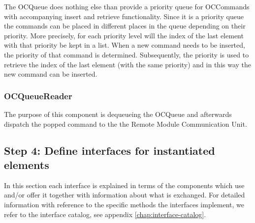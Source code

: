 \npar The OCQueue does nothing else than provide a priority queue for
OCCommands with accompanying insert and retrieve functionality. Since
it is a priority queue the commands can be placed in different places in the
queue depending on their priority. More precisely, for each priority level will
the index of the last element with that priority be kept in a list. When a new
command needs to be inserted, the priority of that command is determined.
Subsequently, the priority is used to retrieve the index of the last element
(with the same priority) and in this way the new command can be inserted.

\subsubsection{OCQueueReader}

\npar The purpose of this component is dequeueing the OCQueue and
afterwards dispatch the popped command to the the Remote Module Communication
Unit.

% 
% 
% 

\subsection{Step 4: Define interfaces for instantiated elements}
\label{add:it7/interfaces}

\npar In this section each interface is explained in terms of the components
which use and/or offer it together with information about what is exchanged. For
detailed information with reference to the specific methods the interfaces
implement, we refer to the interface catalog, see appendix
\ref{chap:interface-catalog}.

